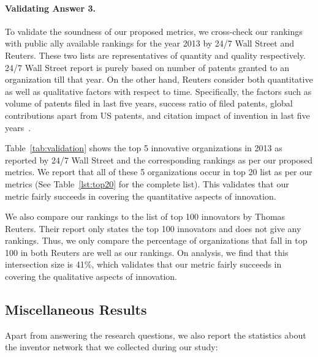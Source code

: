 \paragraph{Validating Answer 3.}
To validate the soundness of our proposed metrics, we cross-check our rankings
with public ally available rankings for the year 2013 by 24/7 Wall Street and
Reuters. These two lists are representatives of quantity and quality
respectively.  24/7 Wall Street report is purely based on number of patents
granted to an organization till that year.  On the other hand, Reuters
consider both quantitative as well as qualitative factors with respect to
time. Specifically, the factors such as volume of patents filed in last five
years, success ratio of filed patents, global contributions apart from US
patents, and citation impact of invention in last five years~\cite{reuters-method}.

Table~\ref{tab:validation} shows the top 5 innovative organizations in 2013 as
reported by 24/7 Wall Street and the corresponding rankings as per our
proposed metrics. We report that all of these 5 organizations occur in top 20
list as per our metrics (See Table~\ref{lst:top20} for the complete list).
This validates that our metric fairly succeeds in covering the quantitative
aspects of innovation.

We also compare our rankings to the list of top 100 innovators by Thomas
Reuters. Their report only states the top 100 innovators and does not give any
rankings. Thus, we only compare the percentage of organizations that fall in
top 100 in both Reuters are well as our rankings. On analysis, we find that
this intersection size is 41\%, which validates that our metric fairly
succeeds in covering the qualitative aspects of innovation.


\subsection{Miscellaneous Results}

Apart from answering the research questions, we also report the statistics about the inventor network that we collected during our study:
 
